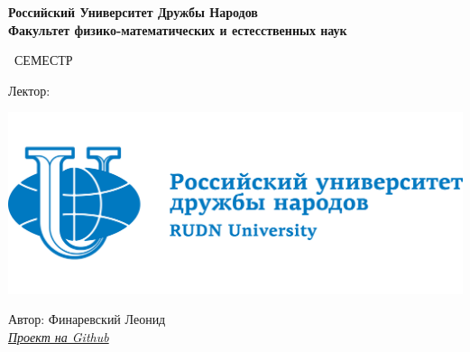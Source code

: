\begin{titlepage}
	\clearpage\thispagestyle{empty}
	\centering
	
	\textbf{Российский Университет Дружбы Народов \\ Факультет физико-математических и естесственных наук}
	\vspace{33ex}
	
	{\textbf{\FullCourseNameFirstPart}}
	
	\SemesterNumber\ СЕМЕСТР  
	\vspace{1ex}
	
	Лектор: \textit{\LecturerInitials}
	
	\includegraphics[width=\textwidth]{images/logo.png}

	\begin{flushright}
		\noindent
		Автор: Финаревский Леонид
		\\
		\href{\VkLink}{\textit{Проект на Github}}
	\end{flushright}
	
	\vfill
	\CourseDate
	\pagebreak
\end{titlepage}